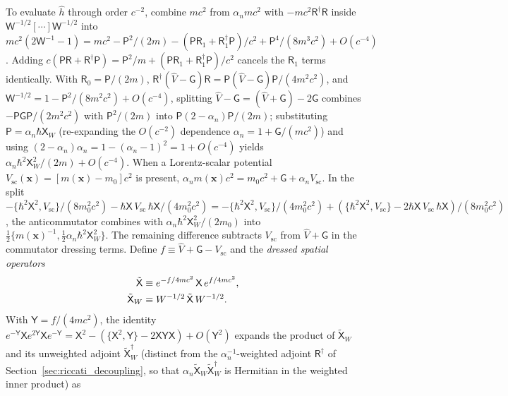 \documentclass[aps,prd,onecolumn,tightenlines,nofootinbib,notitlepage,11pt,floatfix]{revtex4-2}
\theoremstyle{indentedtheorem}
\begin{document}
To evaluate $\hat{h}$ through order $c^{-2}$, combine $mc^2$ from $\alpha_n mc^2$ with $-mc^2\mathsf{R}^\dagger\mathsf{R}$ inside $\mathsf{W}^{-1/2}[\cdots]\mathsf{W}^{-1/2}$ into $mc^2(2\mathsf{W}^{-1}-1) = mc^2 - \mathsf{P}^2/(2m) - (\mathsf{P}\mathsf{R}_1+\mathsf{R}_1^\dagger\mathsf{P})/c^2 + \mathsf{P}^4/(8m^3c^2) + O(c^{-4})$. Adding $c(\mathsf{P}\mathsf{R}+\mathsf{R}^\dagger\mathsf{P}) = \mathsf{P}^2/m + (\mathsf{P}\mathsf{R}_1+\mathsf{R}_1^\dagger\mathsf{P})/c^2$ cancels the $\mathsf{R}_1$ terms identically. With $\mathsf{R}_0 = \mathsf{P}/(2m)$, $\mathsf{R}^\dagger(\hat{V}-\mathsf{G})\mathsf{R} = \mathsf{P}(\hat{V}-\mathsf{G})\mathsf{P}/(4m^2c^2)$, and $\mathsf{W}^{-1/2} = 1 - \mathsf{P}^2/(8m^2c^2) + O(c^{-4})$, splitting $\hat{V}-\mathsf{G} = (\hat{V}+\mathsf{G}) - 2\mathsf{G}$ combines $-\mathsf{P}\mathsf{G}\mathsf{P}/(2m^2c^2)$ with $\mathsf{P}^2/(2m)$ into $\mathsf{P}(2-\alpha_n)\mathsf{P}/(2m)$; substituting $\mathsf{P}=\alpha_n\hbar\mathsf{X}_W$ (re-expanding the $O(c^{-2})$ dependence $\alpha_n = 1+\mathsf{G}/(mc^2)$) and using $(2-\alpha_n)\alpha_n = 1 - (\alpha_n-1)^2 = 1 + O(c^{-4})$ yields $\alpha_n\hbar^2\mathsf{X}_W^2/(2m) + O(c^{-4})$. When a Lorentz-scalar potential $V_\text{sc}(\mathbf{x}) = [m(\mathbf{x})-m_0]c^2$ is present, $\alpha_n m(\mathbf{x})c^2 = m_0c^2 + \mathsf{G} + \alpha_n V_\text{sc}$. In the split $-\{\hbar^2\mathsf{X}^2,V_\text{sc}\}/(8m_0^2c^2) - \hbar\mathsf{X}\,V_\text{sc}\,\hbar\mathsf{X}/(4m_0^2c^2) = -\{\hbar^2\mathsf{X}^2,V_\text{sc}\}/(4m_0^2c^2) + (\{\hbar^2\mathsf{X}^2,V_\text{sc}\}-2\hbar\mathsf{X}\,V_\text{sc}\,\hbar\mathsf{X})/(8m_0^2c^2)$, the anticommutator combines with $\alpha_n\hbar^2\mathsf{X}_W^2/(2m_0)$ into $\tfrac{1}{2}\{m(\mathbf{x})^{-1},\tfrac{1}{2}\alpha_n\hbar^2\mathsf{X}_W^2\}$. The remaining difference subtracts $V_\text{sc}$ from $\hat{V}+\mathsf{G}$ in the commutator dressing terms. Define $f \equiv \hat{V} + \mathsf{G} - V_\text{sc}$ and the \emph{dressed spatial operators}
\begin{align}
    \tilde{\mathsf{X}} &\equiv e^{-f/4mc^2}\,\mathsf{X}\,e^{f/4mc^2} , \notag\\
    \tilde{\mathsf{X}}_W &\equiv W^{-1/2}\,\tilde{\mathsf{X}}\,W^{-1/2} .
    \label{eq:dressed_X}
\end{align}
With $\mathsf{Y}=f/(4mc^2)$, the identity $e^{-\mathsf{Y}}\mathsf{X}e^{2\mathsf{Y}}\mathsf{X}e^{-\mathsf{Y}} = \mathsf{X}^2 - (\{\mathsf{X}^2,\mathsf{Y}\}-2\mathsf{X}\mathsf{Y}\mathsf{X}) + O(\mathsf{Y}^2)$ expands the product of $\tilde{\mathsf{X}}_W$ and its unweighted adjoint $\tilde{\mathsf{X}}_W^\dagger$ (distinct from the $\alpha_n^{-1}$-weighted adjoint $\mathsf{R}^\dagger$ of Section~\ref{sec:riccati_decoupling}, so that $\alpha_n\tilde{\mathsf{X}}_W\tilde{\mathsf{X}}_W^\dagger$ is Hermitian in the weighted inner product) as
\end{document}
